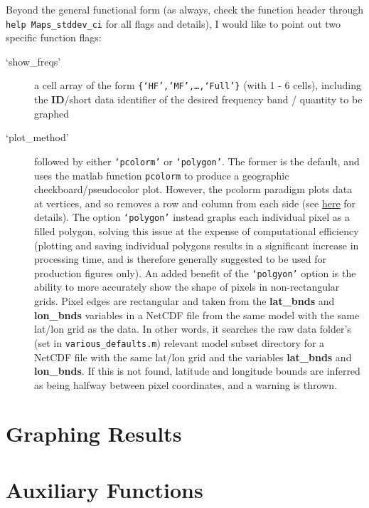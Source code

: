 \documentclass{article}
\begin{document}
Beyond the general functional form (as always, check the function header through \texttt{help Maps\_stddev\_ci} for all flags and details), I would like to point out two specific function flags:
\begin{description}
\item [`show\_freqs'] a cell array of the form \texttt{\{`HF',`MF',\dots,`Full'\}} (with 1 - 6 cells), including the \textbf{ID}/short data identifier of the desired frequency band / quantity to be graphed
\item [`plot\_method'] followed by either \texttt{`pcolorm'} or \texttt{`polygon'}. The former is the default, and uses the matlab function \texttt{pcolorm} to produce a geographic checkboard/pseudocolor plot. However, the pcolorm paradigm plots data at vertices, and so removes a row and column from each side (see \href{http://www.mathworks.com/matlabcentral/fileexchange/50706-offsets-and-missing-data-via-pcolor-and-surf?focused=3873981&tab=example}{\underline{here}} for details). The option \texttt{`polygon'} instead graphs each individual pixel as a filled polygon, solving this issue at the expense of computational efficiency (plotting and saving individual polygons results in a significant increase in processing time, and is therefore generally suggested to be used for production figures only). An added benefit of the \texttt{`polgyon'} option is the ability to more accurately show the shape of pixels in non-rectangular grids. Pixel edges are rectangular and taken from the \textbf{lat\_bnds} and \textbf{lon\_bnds} variables in a NetCDF file from the same model with the same lat/lon grid as the data. In other words, it searches the raw data folder's (set in \texttt{various\_defaults.m}) relevant model subset directory for a NetCDF file with the same lat/lon grid and the variables \textbf{lat\_bnds} and \textbf{lon\_bnds}. If this is not found, latitude and longitude bounds are inferred as being halfway between pixel coordinates, and a warning is thrown. 
\end{description}

\section{Graphing Results} %
\label{func:Plots_Log_Panel_prod.m}

\section{Auxiliary Functions} %
\end{document}
